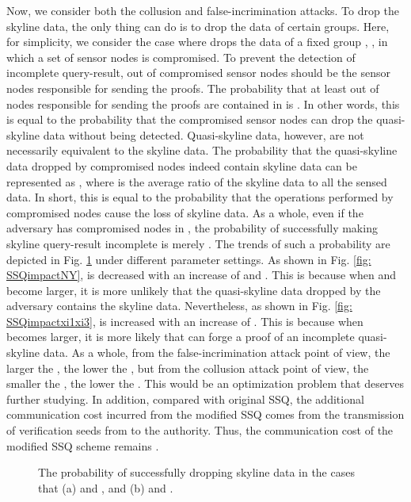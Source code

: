 \documentclass[conference]{IEEEtran}
\begin{document}
Now, we consider both the collusion and false-incrimination attacks. To drop the skyline data, the only thing  can do is to drop the data of certain groups. Here, for simplicity, we consider the case where  drops the data of a fixed group , , in which a set  of  sensor nodes is compromised. To prevent the detection of incomplete query-result,  out of  compromised sensor nodes should be the sensor nodes responsible for sending the proofs. The probability that at least  out of  nodes responsible for sending the proofs are contained in  is . In other words, this is equal to the probability that the compromised sensor nodes can drop the quasi-skyline data without being detected.  Quasi-skyline data, however, are not necessarily equivalent to the skyline data. The probability that the quasi-skyline data dropped by compromised nodes indeed contain skyline data can be represented as , where  is the average ratio of the skyline data to all the sensed data. In short, this is equal to the probability that the operations performed by compromised nodes cause the loss of skyline data. As a whole, even if the adversary has  compromised nodes in , the probability of successfully making skyline query-result incomplete is merely . The trends of such a probability are depicted in Fig. \ref{fig: SSQimpact} under different parameter settings. As shown in Fig. \ref{fig: SSQimpactNY},  is decreased with an increase of  and . This is because when  and  become larger, it is more unlikely that the quasi-skyline data dropped by the adversary contains the skyline data. Nevertheless, as shown in Fig. \ref{fig: SSQimpactxi1xi3},  is increased with an increase of . This is because when  becomes larger, it is more likely that  can forge a proof of an incomplete quasi-skyline data. As a whole, from the false-incrimination attack point of view, the larger the , the lower the , but from the collusion attack point of view, the smaller the , the lower the . This would be an optimization problem that deserves further studying. In addition, compared with original SSQ, the additional communication cost incurred from the modified SSQ comes from the transmission of verification seeds from  to the authority. Thus, the communication cost of the modified SSQ scheme remains .

\begin{figure}[h]
\centering
{}
\caption{\scriptsize The probability of successfully dropping skyline data in the cases that (a)  and , and (b)  and .} \label{fig: SSQimpact}
\end{figure}
\end{document}
